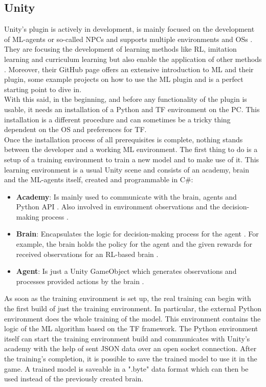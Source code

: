 \documentclass[MGS,Master,english]{twbook}%
\begin{document}
\subsection{Unity}
Unity's plugin is actively in development, is mainly focused on the development of ML-agents or so-called \ac{NPC}s and supports multiple environments and \acp{OS} \cite{unity::mlGithub}. They are focusing the development of learning methods like RL, imitation learning and curriculum learning but also enable the application of other methods \cite{unity::mlGithub}. Moreover, their GitHub page offers an extensive introduction to ML and their plugin, some example projects on how to use the ML plugin and is a perfect starting point to dive in. \\
With this said, in the beginning, and before any functionality of the plugin is usable, it needs an installation of a Python and \ac{TF} environment on the PC. This installation is a different procedure and can sometimes be a tricky thing dependent on the \ac{OS} and preferences for \ac{TF}.\\
Once the installation process of all prerequisites is complete, nothing stands between the developer and a working ML environment. The first thing to do is a setup of a training environment to train a new model and to make use of it. This learning environment is a usual Unity scene and consists of an academy, brain and the ML-agents itself, created and programmable in C\#:
\begin{itemize}
	\item \textbf{Academy}: Is mainly used to communicate with the brain, agents and Python API \cite{unity::mlGithub}. Also involved in environment observations and the decision-making process \cite{unity::mlGithub}. 
	\item \textbf{Brain}: Encapsulates the logic for decision-making process for the agent \cite{unity::mlGithub}. For example, the brain holds the policy for the agent and the given rewards for received observations for an RL-based brain \cite{unity::mlGithub}.
	\item \textbf{Agent}: Is just a Unity GameObject which generates observations and processes provided actions by the brain \cite{unity::mlGithub}.
\end{itemize}  
As soon as the training environment is set up, the real training can begin with the first build of just the training environment. In particular, the external Python environment does the whole training of the model. This environment contains the logic of the ML algorithm based on the \ac{TF} framework. The Python environment itself can start the training environment build and communicates with Unity’s academy with the help of sent \ac{JSON} data over an open socket connection. After the training's completion, it is possible to save the trained model to use it in the game. A trained model is saveable in a ".byte" data format which can then be used instead of the previously created brain.
\end{document}
